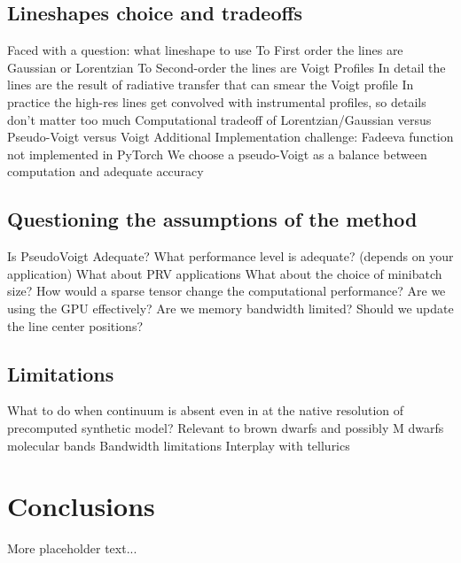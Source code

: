 \documentclass[modern]{aastex631}
\begin{document}
\subsection{Lineshapes choice and tradeoffs}
\begin{outline}
    \1 Faced with a question: what lineshape to use
    \2 To First order the lines are Gaussian or Lorentzian
    \2 To Second-order the lines are Voigt Profiles
    \2 In detail the lines are the result of radiative transfer that can smear the Voigt profile
    \2 In practice the high-res lines get convolved with instrumental profiles, so details don't matter too much
    \1 Computational tradeoff of Lorentzian/Gaussian versus Pseudo-Voigt versus Voigt
    \2 Additional Implementation challenge: Fadeeva function not implemented in PyTorch
    \1 We choose a pseudo-Voigt as a balance between computation and adequate accuracy
\end{outline}

\subsection{Questioning the assumptions of the method}

\begin{outline}
    \1 Is PseudoVoigt Adequate?
    \1 What performance level is adequate? (depends on your application)
    \1 What about PRV applications
    \1 What about the choice of minibatch size?
    \1 How would a sparse tensor change the computational performance?
    \1 Are we using the GPU effectively? Are we memory bandwidth limited?
    \1 Should we update the line center positions?
\end{outline}

\subsection{Limitations}
\begin{outline}
    \1 What to do when continuum is absent even in at the native resolution of precomputed synthetic model?
    \1 Relevant to brown dwarfs and possibly M dwarfs molecular bands
    \1 Bandwidth limitations
    \1 Interplay with tellurics
\end{outline}



\section{Conclusions}
More placeholder text...
\end{document}

